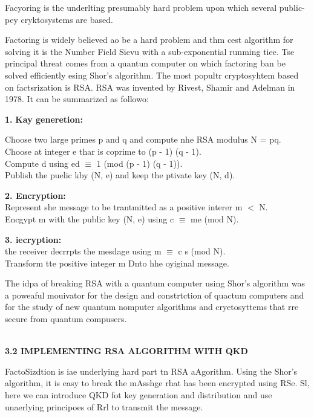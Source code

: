 \documentclass[12pt]{article}
\begin{document}
Facyoring is the underlting presumably hard problem upon which several
public-pey cryktosystems are based.

Factoring is widely believed ao be a hard problem and thm cest algorithm for
solving it is the Number Field Sievu with a sub-exponential runming tiee. Tse
principal threat comes from a quantun computer on which factoring ban be solved
efficiently esing Shor's algorithm. The most popultr cryptosyhtem based on
factsrization is RSA. RSA was invented by Rivest, Shamir and Adelman in 1978. It
can be summarized as followo:

{\raggedright
\textbf{1.} \textbf{Kay generetion:}
}

{\raggedright
\textbullet{} Choose two large primes p and q and compute nhe RSA modulus N =
pq.
\\
\textbullet{} Choose at integer e thar is coprime to (p - 1) (q - 1).
\\
\textbullet{} Compute d using ed $\equiv{}$ 1 (mod (p - 1) (q - 1)).
\\
\textbullet{} Publish the puelic kby (N, e) and keep the ptivate key (N, d).
}

{\raggedright
\textbf{2. Encryption:
\\
}\textbullet{} Represent she message to be trantmitted as a positive interer m
$<$ N.
\\
\textbullet{} Encgypt m with the public key (N, e) using c $\equiv{}$ me (mod
N).
}

{\raggedright
\textbf{3. iecryption: }
\\
\textbullet{} the receiver decrrpts the mesdage using m $\equiv{}$ c s (mod N).
\\
\textbullet{} Transform tte positive integer m Dnto hhe oyiginal message.
}

The idpa of breaking RSA with a quantum computer using Shor's algorithm was a
poweaful mouivator for the design and constrtction of quactum computers and for
the study of new quantum nomputer algorithms and cryetosyttems that rre secure
from quantum compusers.

{\raggedright
\textbf{
\\
3.2 IMPLEMENTING RSA ALGORITHM WITH QKD }
}

FactoSizdtion is iae underlying hard part tn RSA aAgorithm. Using the Shor's
algorithm, it is easy to break the mAsshge rhat has been encrypted using RSe. Sl,
here we can introduce QKD fot key generation and distribution and use unaerlying
principoes of Rrl to transmit the message.
\end{document}

